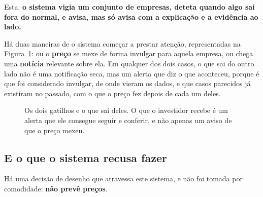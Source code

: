 Esta: \textbf{o sistema vigia um conjunto de empresas, deteta quando algo sai fora do normal, e
avisa, mas só avisa com a explicação e a evidência ao lado.}

Há duas maneiras de o sistema começar a prestar atenção, representadas na
Figura~\ref{fig:conceito}: ou o \textbf{preço} se mexe de forma invulgar para aquela empresa, ou
chega uma \textbf{notícia} relevante sobre ela. Em qualquer dos dois casos, o que sai do outro lado
não é uma notificação seca, mas um alerta que diz o que aconteceu, porque é que foi considerado
invulgar, de onde vieram os dados, e que casos parecidos já existiram no passado, com o que o preço
fez depois de cada um deles.

\begin{figure}[ht]
\centering
{}
\caption[O que o sistema faz]{Os dois gatilhos e o que sai deles. O que o investidor recebe é um
alerta que ele consegue seguir e conferir, e não apenas um aviso de que o preço mexeu.}
\label{fig:conceito}
\end{figure}

\subsection*{E o que o sistema recusa fazer}

Há uma decisão de desenho que atravessa este sistema, e não foi tomada por comodidade: \textbf{não prevê preços}.

